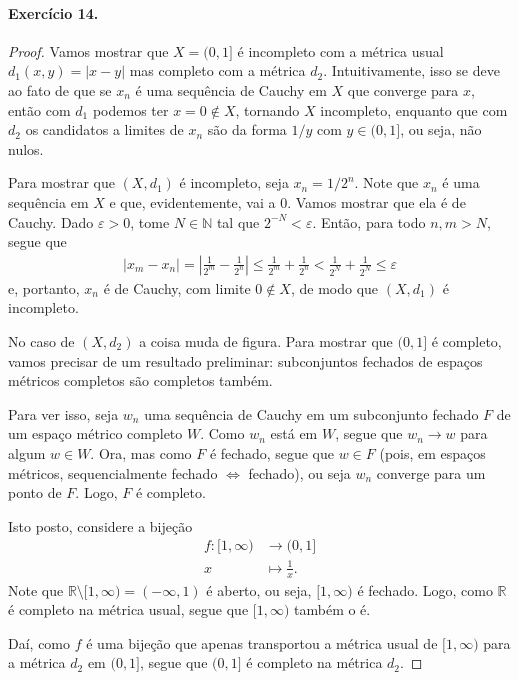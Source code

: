 \documentclass[12pt,a4paper]{article}
\begin{document}
\paragraph{Exercício 14.}
\begin{proof}
Vamos mostrar que $X = (0,1]$ é incompleto com a métrica usual $d_1(x,y) = |x-y|$ mas completo com a métrica $d_2$. Intuitivamente,
isso se deve ao fato de que se $x_n$ é uma sequência de Cauchy em $X$ que converge para $x$, então com $d_1$ podemos ter
$x=0\notin X$, tornando $X$ incompleto, enquanto que com $d_2$ os candidatos a limites de $x_n$ são da forma $1/y$ com $y\in (0,1]$, ou seja, não nulos.

Para mostrar que $(X, d_1)$ é incompleto, seja $x_n = 1/2^n$. Note que $x_n$ é uma sequência em $X$ e que, evidentemente, vai 
a $0$. Vamos mostrar que ela é de Cauchy. Dado $\varepsilon > 0$, tome $N\in\mathbb{N}$ tal que $2^{-N} < \varepsilon$. Então, para todo $n,m > N$, segue que
\begin{align*}
    |x_m - x_n| = \left| \frac{1}{2^m} - \frac{1}{2^n} \right| \leq \frac{1}{2^m} + \frac{1}{2^n} < \frac{1}{2^N} + \frac{1}{2^N} 
    \leq \varepsilon
\end{align*}
e, portanto, $x_n$ é de Cauchy, com limite $0\notin X$, de modo que $(X, d_1)$ é incompleto.

No caso de $(X, d_2)$ a coisa muda de figura. Para mostrar que $(0,1]$ é completo, vamos precisar de um resultado preliminar:
subconjuntos fechados de espaços métricos completos são completos também.

Para ver isso, seja $w_n$ uma sequência de Cauchy em um subconjunto fechado $F$ de um espaço métrico completo $W$. 
Como $w_n$ está em $W$, segue que $w_n \to w$ para algum $w\in W$. Ora, mas como $F$ é fechado, segue que $w\in F$
(pois, em espaços métricos, sequencialmente fechado $\iff$ fechado), ou seja $w_n$ converge para um ponto de $F$. 
Logo, $F$ é completo.

Isto posto, considere a bijeção
\begin{align*}
    f: [1, \infty) &\to (0,1]
    \\
    x&\mapsto \frac{1}{x}.
\end{align*}
Note que $\mathbb{R}\setminus [1, \infty) = (-\infty, 1)$ é aberto, ou seja, $[1, \infty)$ é fechado. Logo, como
$\mathbb{R}$ é completo na métrica usual, segue que $[1, \infty)$ também o é.

Daí, como $f$ é uma bijeção que apenas transportou a métrica usual de $[1, \infty)$
para a métrica $d_2$ em $(0,1]$, segue que $(0,1]$ é completo na métrica $d_2$.
\end{proof}
\end{document}
